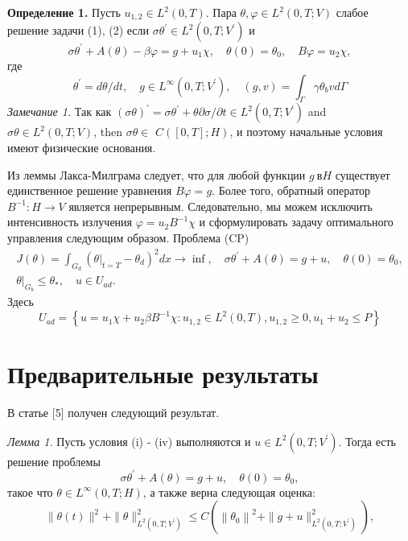    \textbf{Определение 1.} Пусть $u_{1,2} \in L^{2}(0, T)$.
    Пара $\theta, \varphi \in L^{2}(0, T ; V)$ слабое решение задачи (1), (2) если
    $\sigma \theta^{\prime} \in L^{2}\left(0, T ; V^{\prime}\right)$ и
    \[
        \sigma \theta^{\prime}+A(\theta)-\beta \varphi=g+u_{1} \chi, \quad \theta(0)=\theta_{0}, \quad B \varphi=u_{2} \chi,
    \]
    где
    \[
        \theta^{\prime}=d \theta / d t, \quad g \in L^{\infty}\left(0, T ; V^{\prime}\right),
        \quad(g, v)=\int_{\Gamma} \gamma \theta_{b} v d \Gamma
    \]
    \textit{Замечание 1.} Так как $(\sigma \theta)^{\prime}=\sigma \theta^{\prime}+\theta
    \partial \sigma / \partial t \in L^{2}\left(0, T ; V^{\prime}\right)$ and $\sigma
    \theta \in L^{2}(0, T ; V)$, then $\sigma \theta \in$ $C([0, T] ; H)$, и поэтому начальные условия имеют физические основания.

    Из леммы Лакса-Милграма следует, что для любой функции $g\ в H$ существует единственное
    решение уравнения $B\varphi= g$.
    Более того, обратный оператор $B ^{-1}: H \rightarrow V$ является непрерывным.
    Следовательно, мы можем исключить интенсивность излучения $\varphi=u_{2} B ^ {-1} \chi$
    и сформулировать задачу оптимального управления следующим образом.
    Проблема (CP)
    \[
        \begin{gathered}
            J(\theta)=\int_{G_{d}}\left(\left.\theta\right|_{t=T}-\theta_{d}\right)^{2} d x \rightarrow \inf ,
            \quad \sigma \theta^{\prime}+A(\theta)=g+u, \quad \theta(0)=\theta_{0}, \\
            \left.\theta\right|_{G_{b}} \leq \theta_{*}, \quad u \in U_{a d}.
        \end{gathered}
    \]
    Здесь
    \[
        U_{a d}=\left\{u=u_{1} \chi+u_{2} \beta B^{-1} \chi: u_{1,2} \in L^{2}(0, T), u_{1,2}
        \geq 0, u_{1}+u_{2} \leq P\right\}
    \]


    \section{Предварительные результаты}
    В статье [5] получен следующий результат.

    \textit{Лемма 1.}
    Пусть условия (i) - (iv) выполняются и $u \in L^{2}\left(0, T ; V^{\prime}\right)$.
    Тогда есть решение проблемы
    \[
        \sigma \theta^{\prime}+A(\theta)=g+u, \quad \theta(0)=\theta_{0},
    \]
    такое что $\theta \in L^{\infty}(0, T ; H)$, а также верна следующая оценка:
    \[
        \|\theta(t)\|^{2}+\|\theta\|_{L^{2}\left(0, T ; V^{\prime}\right)}^{2} \leq C\left(\left\|\theta_{0}\right\|^{2}+\|g+u\|_{L^{2}\left(0, T ; V^{\prime}\right)}^{2}\right),
    \]

